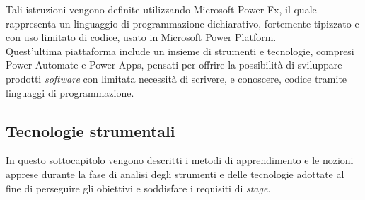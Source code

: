Tali istruzioni vengono definite utilizzando Microsoft Power Fx, il quale rappresenta un linguaggio di programmazione dichiarativo, fortemente tipizzato e con uso limitato di codice, usato in Microsoft Power Platform.\\
Quest'ultima piattaforma include un insieme di strumenti e tecnologie, compresi Power Automate e Power Apps, pensati per offrire la possibilità di sviluppare prodotti \emph{software} con limitata necessità di scrivere, e conoscere, codice tramite linguaggi di programmazione.\\

\subsection{Tecnologie strumentali}
In questo sottocapitolo vengono descritti i metodi di apprendimento e le nozioni apprese durante la fase di analisi degli strumenti e delle tecnologie adottate al fine di perseguire gli obiettivi e soddisfare i requisiti di \emph{stage}.
